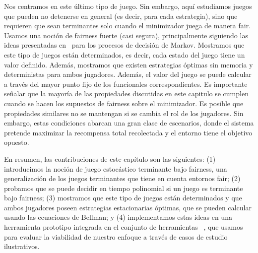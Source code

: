 Nos centramos en este último tipo de juego. Sin embargo, aquí estudiamos juegos que pueden no detenerse en general (es decir, para cada estrategia), sino que requieren que sean terminantes solo cuando el minimizador juega de manera fair.
Usamos una noción de fairness fuerte (casi segura), principalmente siguiendo las ideas presentadas en~\cite{DBLP:journals/dc/BaierK98} para los procesos de decisión de Markov. Mostramos que este tipo de juegos están determinados, es decir, cada estado del juego tiene un valor definido. Además, mostramos que existen estrategias óptimas sin memoria y deterministas para ambos jugadores. Además, el valor del juego se puede calcular a través del mayor punto fijo de los funcionales correspondientes.
Es importante señalar que la mayoría de las propiedades discutidas en este capitulo se cumplen cuando se hacen los supuestos de fairness sobre el minimizador. Es posible que propiedades similares no se mantengan si se cambia el rol de los jugadores.
Sin embargo, estas condiciones abarcan una gran clase de escenarios, donde el sistema pretende maximizar la recompensa total recolectada y el entorno tiene el objetivo opuesto.

En resumen, las contribuciones de este capítulo son las siguientes: (1) introducimos la noción de juego estocástico terminante bajo fairness, una generalización de los juegos terminantes que tiene en cuenta entornos fair; (2) probamos que se puede decidir en tiempo polinomial si un juego es terminante bajo fairness; (3) mostramos que este tipo de juegos están determinados y que ambos jugadores poseen estrategias estacionarias óptimas, que se pueden calcular usando las ecuaciones de Bellman; y (4) implementamos estas ideas en una herramienta prototipo integrada en el conjunto de herramientas {\PrismGames}~\cite{DBLP:conf/cav/KwiatkowskaN0S20}, que usamos para evaluar la viabilidad de nuestro enfoque a través de casos de estudio ilustrativos.

